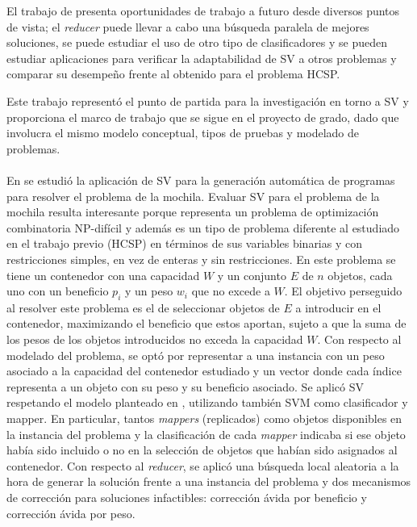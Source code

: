 El trabajo de \citet{savant-original} presenta oportunidades de trabajo a futuro desde diversos puntos de vista; el \textit{reducer} puede llevar a cabo una búsqueda paralela de mejores soluciones, se puede estudiar el uso de otro tipo de clasificadores y se pueden estudiar aplicaciones para verificar la adaptabilidad de SV a otros problemas y comparar su desempeño frente al obtenido para el problema HCSP. 

Este trabajo representó el punto de partida para la investigación en torno a SV y proporciona el marco de trabajo que se sigue en el proyecto de grado, dado que involucra el mismo modelo conceptual, tipos de pruebas y modelado de problemas.

\paragraph{}En \citet{savant-bag} se estudió la aplicación de SV para la generación automática de programas para resolver el problema de la mochila.
Evaluar SV para el problema de la mochila resulta interesante porque representa un problema de optimización combinatoria NP-difícil y además es un tipo de problema diferente al estudiado en el trabajo previo (HCSP) en términos de sus variables binarias y con restricciones simples, en vez de enteras y sin restricciones.
En este problema se tiene un contenedor con una capacidad $W$ y un conjunto $E$ de $n$ objetos, cada uno con un beneficio $p_i$ y un peso $w_i$ que no excede a $W$.
El objetivo perseguido al resolver este problema es el de seleccionar objetos de $E$ a introducir en el contenedor, maximizando el beneficio que estos aportan, sujeto a que la suma de los pesos de los objetos introducidos no exceda la capacidad $W$.
Con respecto al modelado del problema, se optó por representar a una instancia con un peso asociado a la capacidad del contenedor estudiado y un vector donde cada índice representa a un objeto con su peso y su beneficio asociado.
Se aplicó SV respetando el modelo planteado en \citet{savant-original}, utilizando también SVM como clasificador y mapper.
En particular, tantos \textit{mappers} (replicados) como objetos disponibles en la instancia del problema y la clasificación de cada \textit{mapper} indicaba si ese objeto había sido incluido o no en la selección de objetos que habían sido asignados al contenedor.
Con respecto al \textit{reducer}, se aplicó una búsqueda local aleatoria a la hora de generar la solución frente a una instancia del problema y dos mecanismos de corrección para soluciones infactibles: corrección ávida por beneficio y corrección ávida por peso.
